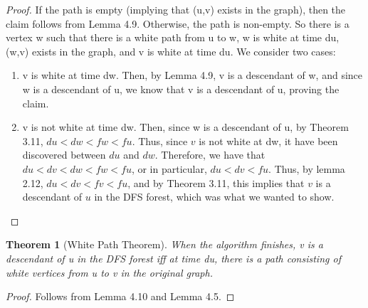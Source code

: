 \documentclass{article}
\newtheorem{theorem}{Theorem}[section]
\begin{document}
\begin{proof}
If the path is empty (implying that (u,v) exists in the graph), then the claim follows from Lemma 4.9. Otherwise, the path is non-empty. So there is a vertex w such that there is a white path from u to w, w is white at time du, (w,v) exists in the graph, and v is white at time du. We consider two cases:
\begin{enumerate}
\item
v is white at time dw. Then, by Lemma 4.9, v is a descendant of w, and since w is a descendant of u, we know that v is a descendant of u, proving the claim.
\item
v is not white at time dw. Then, since w is a descendant of u, by Theorem 3.11, $du < dw < fw < fu$. Thus, since $v$ is not white at dw, it have been discovered between $du$ and $dw$. Therefore, we have that $du < dv < dw < fw < fu$, or in particular, $du < dv < fu$. Thus, by lemma 2.12, $du < dv < fv < fu$, and by Theorem 3.11, this implies that $v$ is a descendant of $u$ in the DFS forest, which was what we wanted to show.
\end{enumerate}
\end{proof}
\begin{theorem}[White Path Theorem]
When the algorithm finishes, v is a descendant of u in the DFS forest iff at time du, there is a path consisting of white vertices from u to v in the original graph.
\end{theorem}
\begin{proof}
Follows from Lemma 4.10 and Lemma 4.5.
\end{proof}
\end{document}
